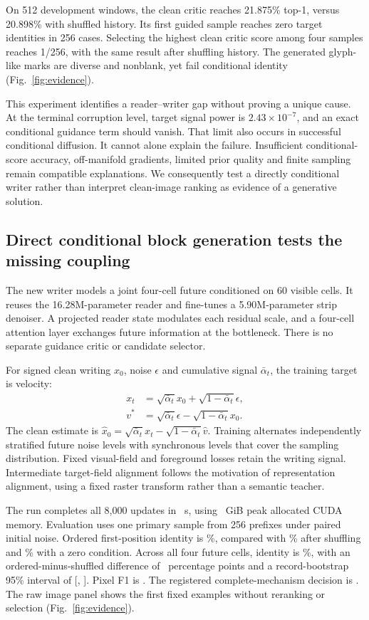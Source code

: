 On 512 development windows, the clean critic reaches 21.875\% top-1, versus
20.898\% with shuffled history. Its first guided sample reaches zero target
identities in 256 cases. Selecting the highest clean critic score among four
samples reaches 1/256, with the same result after shuffling history. The
generated glyph-like marks are diverse and nonblank, yet fail conditional
identity (Fig.~\ref{fig:evidence}).

This experiment identifies a reader--writer gap without proving a unique
cause. At the terminal corruption level, target signal power is
$2.43\times10^{-7}$, and an exact conditional guidance term should vanish.
That limit also occurs in successful conditional diffusion. It cannot alone
explain the failure. Insufficient conditional-score accuracy, off-manifold
gradients, limited prior quality and finite sampling remain compatible
explanations. We consequently test a directly conditional writer rather than
interpret clean-image ranking as evidence of a generative solution.

\subsection*{Direct conditional block generation tests the missing coupling}
The new writer models a joint four-cell future conditioned on 60 visible
cells. It reuses the 16.28M-parameter reader and fine-tunes a 5.90M-parameter
strip denoiser. A projected reader state modulates each residual scale, and a
four-cell attention layer exchanges future information at the bottleneck.
There is no separate guidance critic or candidate selector.

For signed clean writing $x_0$, noise $\epsilon$ and cumulative signal
$\bar\alpha_t$, the training target is velocity:
\begin{align}
x_t&=\sqrt{\bar\alpha_t}x_0+\sqrt{1-\bar\alpha_t}\epsilon,\\
v^*&=\sqrt{\bar\alpha_t}\epsilon-\sqrt{1-\bar\alpha_t}x_0.
\end{align}
The clean estimate is
$\hat x_0=\sqrt{\bar\alpha_t}x_t-\sqrt{1-\bar\alpha_t}\hat v$.
Training alternates independently stratified future noise levels with
synchronous levels that cover the sampling distribution. Fixed visual-field
and foreground losses retain the writing signal. Intermediate target-field
alignment follows the motivation of representation alignment\cite{repa},
using a fixed raster transform rather than a semantic teacher.

The run completes all 8,000 updates in \TrainSeconds\ s, using
\TrainMemory\ GiB peak allocated CUDA memory. Evaluation uses one primary
sample from 256 prefixes under paired initial noise. Ordered first-position
identity is \FirstIdentity\%, compared with \FirstShuffled\% after shuffling
and \FirstZero\% with a zero condition. Across all four future cells, identity
is \BlockIdentity\%, with an ordered-minus-shuffled difference of
\BlockGain\ percentage points and a record-bootstrap 95\% interval of
[\BlockLow, \BlockHigh]. Pixel F1 is \BlockFone.
The registered complete-mechanism decision is \texttt{\RunDecision}.
The raw image panel shows the first fixed examples without reranking or
selection (Fig.~\ref{fig:evidence}).

